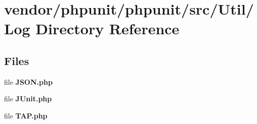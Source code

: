 \section{vendor/phpunit/phpunit/src/\+Util/\+Log Directory Reference}
\label{dir_37304863ba84a79d4503b50569a73738}
\subsection*{Files}
\begin{DoxyCompactItemize}
\item 
file {\bf J\+S\+O\+N.\+php}
\item 
file {\bf J\+Unit.\+php}
\item 
file {\bf T\+A\+P.\+php}
\end{DoxyCompactItemize}
